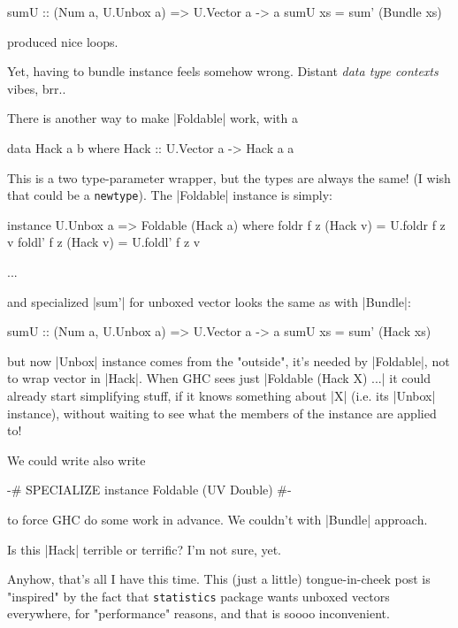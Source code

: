 \begin{code}
sumU :: (Num a, U.Unbox a) => U.Vector a -> a
sumU xs = sum' (Bundle xs)
\end{code}

produced nice loops.

Yet, having to bundle instance feels somehow wrong.
Distant \emph{data type contexts} vibes, brr..

There is another way to make |Foldable| work, with a

\begin{code}
data Hack a b where
    Hack :: U.Vector a -> Hack a a
\end{code}

This is a two type-parameter wrapper, but the types are always the same!
(I wish that could be a \texttt{newtype}).
The |Foldable| instance is simply:

\begin{code}
instance U.Unbox a => Foldable (Hack a) where
    foldr f z (Hack v)  = U.foldr f z v
    foldl' f z (Hack v) = U.foldl' f z v

    ...
\end{code}

and specialized |sum'| for unboxed vector looks the same as with |Bundle|:

\begin{code}
sumU :: (Num a, U.Unbox a) => U.Vector a -> a
sumU xs = sum' (Hack xs)
\end{code}

but now |Unbox| instance comes from the "outside", it's needed by |Foldable|,
not to wrap vector in |Hack|.
When GHC sees just |Foldable (Hack X) ...| it could already start simplifying
stuff, if it knows something about |X| (i.e. its |Unbox| instance),
without waiting to see what the members of the instance are applied to!

We could write also write

\begin{code}
{-# SPECIALIZE instance Foldable (UV Double) #-}
\end{code}

to force GHC do some work in advance. We couldn't with |Bundle| approach.

Is this |Hack| terrible or terrific? I'm not sure, yet.

Anyhow, that's all I have this time.
This (just a little) tongue-in-cheek post is "inspired" by the fact
that \texttt{statistics} package wants unboxed vectors everywhere,
for "performance" reasons, and that is soooo inconvenient.

